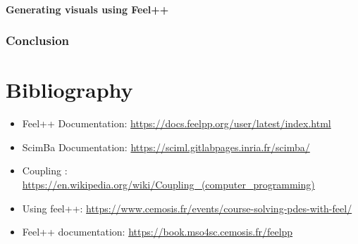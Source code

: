 \documentclass[12pt]{article}
\begin{document}
\subsection{Generating visuals using Feel++}


\newpage

\section{Conclusion}


\newpage

\part*{Bibliography}




\begin{itemize}
    \item Feel++ Documentation: \url{https://docs.feelpp.org/user/latest/index.html}
    \item ScimBa Documentation: \url{https://sciml.gitlabpages.inria.fr/scimba/}
    \item Coupling : \url{https://en.wikipedia.org/wiki/Coupling_(computer_programming)}
    \item Using feel++:
    \url{https://www.cemosis.fr/events/course-solving-pdes-with-feel/}
    \item Feel++ documentation:
    \url{https://book.mso4sc.cemosis.fr/feelpp}

\end{itemize}
\end{document}
